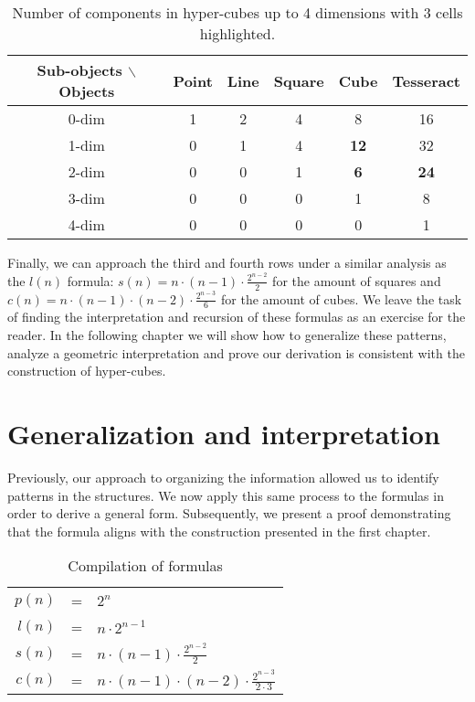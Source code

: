 \documentclass{article}
\begin{document}
	\begin{table}[ht]
		\centering
		\caption{Number of components in hyper-cubes up to 4 dimensions with 3 cells highlighted.}
		\begin{tabular}{||c || c c c c c||}
			\hline
			Sub-objects $\backslash$ Objects & Point & Line & Square & Cube & Tesseract \cite{coxeter1973regular}\\\hline\hline
			0-dim & 1 & 2 & 4 & 8  & 16\\\hline
			1-dim & 0 & 1 & 4 & \textbf{12} & 32\\\hline
			2-dim & 0 & 0 & 1 & \textbf{6}  & \textbf{24}\\\hline
			3-dim & 0 & 0 & 0 & 1  & 8 \\\hline
			4-dim & 0 & 0 & 0 & 0  & 1\\\hline
		\end{tabular}
		\label{4d_objects_table}
	\end{table}
	
	Finally, we can approach the third and fourth rows under a similar analysis as the $l(n)$ formula: $s(n) = n\cdot(n-1)\cdot\frac{2^{n-2}}{2}$ for the amount of squares and $c(n) = n\cdot(n-1)\cdot(n-2)\cdot\frac{2^{n-3}}{6}$ for the amount of cubes. We leave the task of finding the interpretation and recursion of these formulas as an exercise for the reader. In the following chapter we will show how to generalize these patterns, analyze a geometric interpretation and prove our derivation is consistent with the construction of hyper-cubes.
	
	\section{Generalization and interpretation \label{sec:generalization}}
	
	Previously, our approach to organizing the information allowed us to identify patterns in the structures. We now apply this same process to the formulas in order to derive a general form. Subsequently, we present a proof demonstrating that the formula aligns with the construction presented in the first chapter.
	
	\begin{table}[ht]
		\centering
		\caption{Compilation of formulas}
		\begin{tabular}{r c l}
			$p(n)$ & = &$ 2^{n}$ \\[0.7ex]
			$l(n)$ & = &$ n \cdot 2^{n-1}$ \\[0.4ex]
			$s(n)$ & = &$ n\cdot(n-1)\cdot\frac{2^{n-2}}{2}$\\[0.4ex]
			$c(n)$ & = &$ n \cdot (n-1) \cdot (n-2) \cdot \frac{2^{n-3}}{2 \cdot 3}$
		\end{tabular}
		\label{resume_table}
	\end{table}
	
\end{document}
